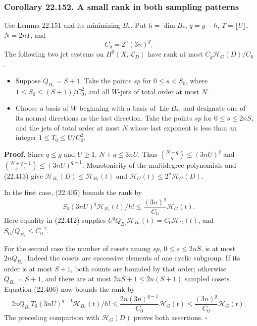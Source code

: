 \documentclass[
  11pt,
  a4paper,
]{article}
\providecommand{\tightlist}{%
  \setlength{\itemsep}{0pt}\setlength{\parskip}{0pt}}
\begin{document}
\subsubsection{Corollary 22.152. A small rank in both sampling
patterns}\label{corollary-22.152.-a-small-rank-in-both-sampling-patterns}

Use Lemma 22.151 and its minimizing \(B_*\). Put \(h=\dim B_*\),
\(q=g-h\), \(T=\lfloor U\rfloor\), \(N=2nT\), and \[
 C_g=2^n(3n)^g.
 \tag{22.416}
\] The following two jet systems on \(H^0(X,\mathcal L_D)\) have rank at
most \(C_g\mathcal H_G(D)/C_0\).

\begin{itemize}
\tightlist
\item
  Suppose \(Q_{B_*}=S+1\). Take the points \(sp\) for \(0\le s<S_0\),
  where \(1\le S_0\le(S+1)/C_0^2\), and all \(W\)-jets of total order at
  most \(N\).
\item
  Choose a basis of \(W\) beginning with a basis of
  \(\operatorname{Lie}B_*\), and designate one of its normal directions
  as the last direction. Take the points \(sp\) for \(0\le s\le2nS\),
  and the jets of total order at most \(N\) whose last exponent is less
  than an integer \(1\le T_0\le U/C_0^2\).
\end{itemize}

\textbf{Proof.} Since \(q\le g\) and \(U\ge1\), \(N+q\le3nU\). Thus
\(\binom{N+q}{q}\le(3nU)^q\) and \(\binom{N+q-1}{q-1}\le(3nU)^{q-1}\).
Monotonicity of the multidegree polynomials and (22.413) give
\(\mathcal H_{B_*}(D)\le\mathcal H_{B_*}(t)\) and
\(\mathcal H_G(t)\le2^n\mathcal H_G(D)\).

In the first case, (22.405) bounds the rank by \[
 S_0(3nU)^q\mathcal H_{B_*}(t)/h!
 \le \frac{(3n)^g}{C_0}\mathcal H_G(t).
 \tag{22.417}
\] Here equality in (22.412) supplies
\(U^q Q_{B_*}\mathcal H_{B_*}(t)=C_0\mathcal H_G(t)\), and
\(S_0/Q_{B_*}\le C_0^{-2}\).

For the second case the number of cosets among \(sp\), \(0\le s\le2nS\),
is at most \(2nQ_{B_*}\). Indeed the cosets are successive elements of
one cyclic subgroup. If its order is at most \(S+1\), both counts are
bounded by that order; otherwise \(Q_{B_*}=S+1\), and there are at most
\(2nS+1\le2n(S+1)\) sampled cosets. Equation (22.406) now bounds the
rank by \[
 2nQ_{B_*}T_0(3nU)^{q-1}\mathcal H_{B_*}(t)/h!
 \le\frac{2n(3n)^{q-1}}{C_0}\mathcal H_G(t)
 \le\frac{(3n)^g}{C_0}\mathcal H_G(t).
 \tag{22.418}
\] The preceding comparison with \(\mathcal H_G(D)\) proves both
assertions. \(\square\)
\end{document}
